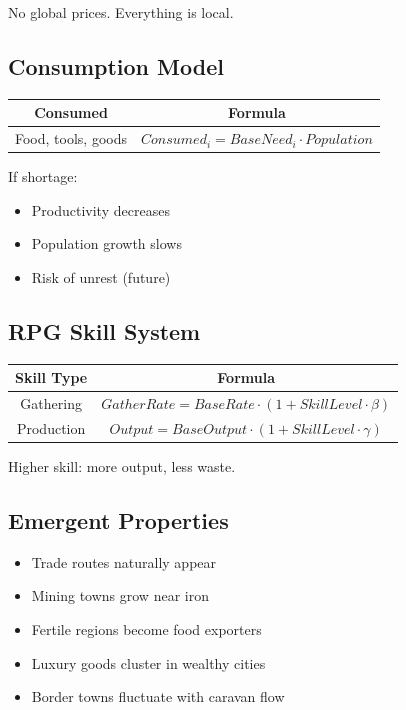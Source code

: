 \documentclass[a4paper,12pt]{article}
\begin{document}
No global prices. Everything is local.



\subsection{Consumption Model}

\begin{table}[H]
\centering
\begin{tabular}{|c|c|}
\hline
Consumed & Formula \\
\hline
Food, tools, goods & $Consumed_i = BaseNeed_i \cdot Population$ \\
\hline
\end{tabular}
\end{table}

If shortage:

\begin{itemize}
\item Productivity decreases
\item Population growth slows
\item Risk of unrest (future)
\end{itemize}



\subsection{RPG Skill System}

\begin{table}[H]
\centering
\begin{tabular}{|c|c|}
\hline
Skill Type & Formula \\
\hline
Gathering & $GatherRate = BaseRate \cdot (1 + SkillLevel \cdot \beta)$ \\
Production & $Output = BaseOutput \cdot (1 + SkillLevel \cdot \gamma)$ \\
\hline
\end{tabular}
\end{table}

Higher skill: more output, less waste.



\subsection{Emergent Properties}

\begin{itemize}
\item Trade routes naturally appear
\item Mining towns grow near iron
\item Fertile regions become food exporters
\item Luxury goods cluster in wealthy cities
\item Border towns fluctuate with caravan flow
\end{itemize}
\end{document}
